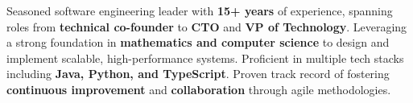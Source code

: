 
Seasoned software engineering leader with \textbf{15+ years} of experience, spanning roles from \textbf{technical co-founder} to \textbf{CTO} and \textbf{VP of Technology}. Leveraging a strong foundation in \textbf{mathematics and computer science} to design and implement scalable, high-performance systems. Proficient in multiple tech stacks including \textbf{Java, Python, and TypeScript}. Proven track record of fostering \textbf{continuous improvement} and \textbf{collaboration} through agile methodologies.

\vspace{2cm}

\bigskip

